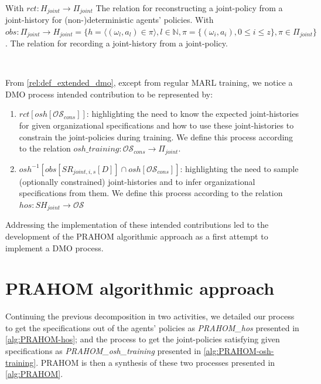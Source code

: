 \documentclass[doubleblind]{ecai}
\newcounter{relation}
\begin{document}
\

\noindent With $rct: H_{joint} \rightarrow \Pi_{joint}$
The relation for reconstructing a joint-policy from a joint-history for (non-)deterministic agents' policies.
\noindent With $obs: \Pi_{joint} \rightarrow H_{joint} = \{h = \langle (\omega_l, a_l) \in \pi \rangle, l \in \mathbb{N}, \pi = \{ (\omega_i, a_i), 0 \leq i \leq z \}, \pi \in \Pi_{joint}\}$. The relation for recording a joint-history from a joint-policy.

\

From \autoref{rel:def_extended_dmo}, except from regular MARL training, we notice a DMO process intended contribution to be represented by:
\begin{enumerate}
    \item $rct[osh[\mathcal{OS}_{cons}]]$: highlighting the need to know the expected joint-histories for given organizational specifications and how to use these joint-histories to constrain the joint-policies during training. We define this process according to the relation $osh\_training: \mathcal{OS}_{cons} \rightarrow \Pi_{joint}$.
    \item $osh^{-1}[obs[SR_{joint,i,s}[D]] \cap osh[\mathcal{OS}_{cons}]]$: highlighting the need to sample (optionally constrained) joint-histories and to infer organizational specifications from them. We define this process according to the relation $hos: SH_{joint} \rightarrow \mathcal{OS}$
\end{enumerate}

Addressing the implementation of these intended contributions led to the development of the PRAHOM algorithmic approach as a first attempt to implement a DMO process.

\section{PRAHOM algorithmic approach}

Continuing the previous decomposition in two activities, we detailed our process to get the specifications out of the agents' policies as \emph{PRAHOM\_hos} presented in \autoref{alg:PRAHOM-hos}; and the process to get the joint-policies satisfying given specifications as \emph{PRAHOM\_osh\_training} presented in \autoref{alg:PRAHOM-osh-training}. PRAHOM is then a synthesis of these two processes presented in \autoref{alg:PRAHOM}.
\end{document}
